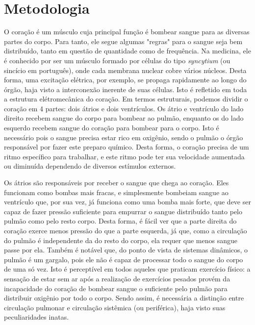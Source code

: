 \documentclass[12pt, a4paper, twoside]{article}
\begin{document}
\section{Metodologia}

O coração é um músculo cuja principal função é bombear sangue para as diversas partes do corpo. Para tanto, ele segue algumas "regras" para o sangue seja bem distribuído, tanto em questão de quantidade como de frequência. Na medicina, ele é conhecido por ser um músculo formado por células do tipo \textit{syncytium} (ou sincício em português), onde cada membrana nuclear cobre vários núcleos. Desta forma, uma excitação elétrica, por exemplo, se propaga rapidamente ao longo do órgão, haja visto a interconexão inerente de suas células. Isto é refletido em toda a estrutura elétromecânica do coração. Em termos estruturais, podemos dividir o coração em 4 partes: dois átrios e dois ventrículos. Os átrio e ventrículo do lado direito recebem sangue do corpo para bombear ao pulmão, enquanto os do lado esquerdo recebem sangue do coração para bombear para o corpo. Isto é necessário pois o sangue precisa estar rico em oxigênio, sendo o pulmão o órgão responsável por fazer este preparo químico. Desta forma, o coração precisa de um ritmo específico para trabalhar, e este ritmo pode ter sua velocidade aumentada ou diminuída dependendo de diversos estímulos externos.

Os átrios são responsáveis por receber o sangue que chega ao coração. Eles funcionam como bombas mais fracas, e simplesmente bombeiam sangue ao ventrículo que, por sua vez, já funciona como uma bomba mais forte, que deve ser capaz de fazer pressão suficiente para empurrar o sangue distribuído tanto pelo pulmão como pelo resto corpo. Desta forma, é fácil ver que a parte direita do coração exerce menos pressão do que a parte esquerda, já que, como a circulação do pulmão é independente da do resto do corpo, ela requer que menos sangue passe por ela. Também é notável que, do ponto de vista de sistemas dinâmicos, o pulmão é um gargalo, pois ele não é capaz de processar todo o sangue do corpo de uma só vez. Isto é perceptível em todos aqueles que praticam exercício físico: a sensação de estar sem ar após a realização de exercícios pesados provém da incapacidade do coração de bombear sangue o suficiente pelo pulmão para distribuir oxigênio por todo o corpo. Sendo assim, é necessária a distinção entre circulação pulmonar e circulação sistêmica (ou periférica), haja visto suas peculiaridades inatas.
\end{document}
